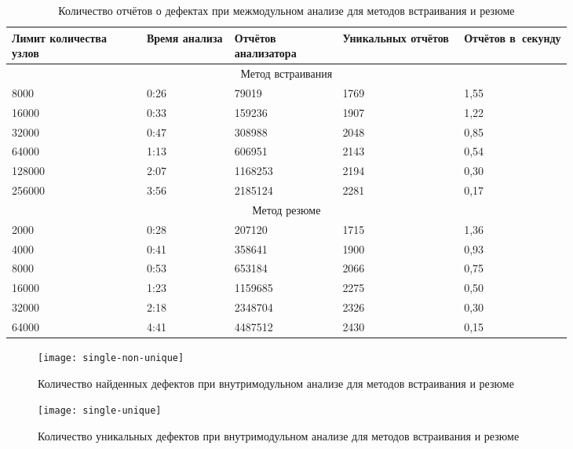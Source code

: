 \begin{table}
\renewcommand{\arraystretch}{1.2}
\begin{tabular}{| p{0.2\linewidth} | p{0.13\linewidth} | p{0.16\linewidth} | p{0.18\linewidth} |  p{0.16\linewidth} |} 
\hline
Лимит количества узлов & Время анализа & Отчётов анализатора & Уникальных отчётов & Отчётов в~секунду \\
\hline
\multicolumn{5}{|c|}{Метод встраивания} \\
\hline
\hline
8000      &   0:26       & 79019  & 1769 & 1,55 \\
\hline
16000     &  0:33        & 159236  & 1907 & 1,22 \\
\hline
32000     &  0:47        & 308988  & 2048 & 0,85 \\
\hline
64000     &  1:13        & 606951  & 2143 & 0,54 \\
\hline
128000    &   2:07       & 1168253  & 2194 & 0,30 \\
\hline
256000    &   3:56       & 2185124  & 2281 & 0,17 \\
\hline
\hline
\multicolumn{5}{|c|}{Метод резюме} \\
\hline
\hline
2000      &   0:28       & 207120  & 1715 & 1,36 \\
\hline
4000      &   0:41       & 358641  & 1900 & 0,93 \\
\hline
8000      &   0:53       & 653184  & 2066 & 0,75 \\
\hline
16000     &  1:23        & 1159685  & 2275 & 0,50 \\
\hline
32000     &  2:18        & 2348704  & 2326 & 0,30 \\
\hline
64000     &  4:41        & 4487512  & 2430 & 0,15 \\
\hline
\hline

\end{tabular}
\caption{Количество отчётов о дефектах при межмодульном анализе для методов встраивания и резюме} \label{table:time-defect-xtu}
\end{table}

\begin{figure}[h]
   \centering
   \texttt{[image: single-non-unique]}
   \caption{Количество найденных дефектов при внутримодульном анализе для методов встраивания и резюме}\label{pic:single-non-unique}
\end{figure}


\begin{figure}[h]
   \centering
   \texttt{[image: single-unique]}
   \caption{Количество уникальных дефектов при внутримодульном анализе для методов встраивания и резюме}\label{pic:single-unique}
\end{figure}



